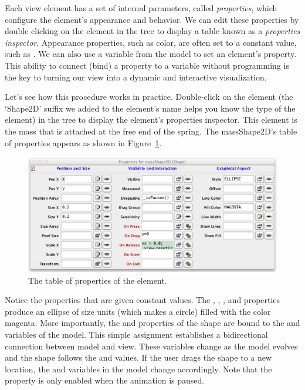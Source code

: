 Each view element has a set of internal parameters, called \emph{properties}, which
configure the element's appearance and behavior. We can edit these properties by double clicking on the element in the
tree to display a table known as a \emph{properties inspector}.  Appearance properties, such as color, are often set to a constant value, such as . We can also use a variable from the model to set an element's property. This ability to connect (bind) a property to a variable without programming is the key to turning our view into a dynamic and interactive
visualization.

Let's see how this procedure works in practice. Double-click on the  element (the `Shape2D' suffix we added to the element's name helps you know the type of the element) in the tree to display
the element's properties inspector. This element is the mass that is attached at the free end of the spring. The massShape2D's table of properties appears as shown in Figure~\ref{fig:02ExplorationJava/SpringBallProperties}.
\begin{figure}[htb]
    \centering
  \includegraphics[scale=\scale]{02ExplorationJava/images/SpringBallProperties.png}
    \caption{The table of properties of the  element.}
    \label{fig:02ExplorationJava/SpringBallProperties}
\end{figure}

Notice the properties that are given constant values. The , , , and  properties produce an ellipse of size  units (which makes a circle) filled with the color
magenta. More importantly, the  and  properties of  the shape are bound to the  and 
variables of the model. This simple assignment establishes a bidirectional connection between model and view. These
variables change as the model evolves and the shape follows the  and  values. If the user drags the
shape to a new location, the  and  variables in the model change accordingly.  Note that the  property is only enabled when the animation is paused.

